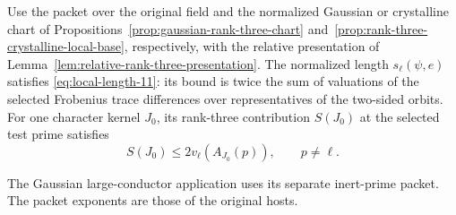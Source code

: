 \begin{proposition}
\label{prop:rank-three-original-trace-bound}
Use the packet over the original field and the normalized Gaussian
or crystalline chart of Propositions~\ref{prop:gaussian-rank-three-chart}
and~\ref{prop:rank-three-crystalline-local-base}, respectively, with the
relative presentation of Lemma~\ref{lem:relative-rank-three-presentation}.
The normalized
length \(s_\ell(\psi,e)\) satisfies \textup{\eqref{eq:local-length-11}}: its bound is
twice the sum of valuations of the selected Frobenius trace
differences over representatives of the two-sided orbits.
For one character kernel \(J_0\), its rank-three contribution \(S(J_0)\) at the selected test prime satisfies 
\[
 S(J_0)\le 2v_\ell(A_{J_0}(p)),\qquad p\ne\ell.
\]

The Gaussian large-conductor application uses its separate
inert-prime packet. The packet exponents are those of the
original hosts.
\end{proposition}

